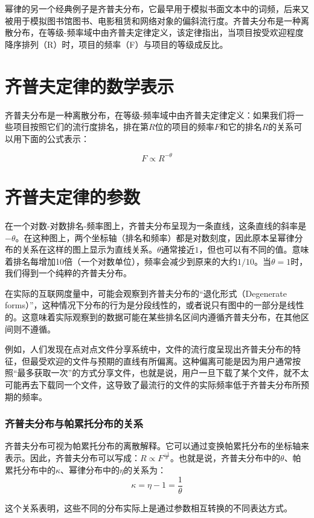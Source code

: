 幂律的另一个经典例子是齐普夫分布，它最早用于模拟书面文本中的词频，后来又被用于模拟图书馆图书、电影租赁和网络对象的偏斜流行度。齐普夫分布是一种离散分布，在等级-频率域中由齐普夫定律定义，该定律指出，当项目按受欢迎程度降序排列（R）时，项目的频率（F）与项目的等级成反比。


\section{齐普夫定律的数学表示}

齐普夫分布是一种离散分布，在等级-频率域中由齐普夫定律定义：如果我们将一些项目按照它们的流行度排名，排在第$R$位的项目的频率$F$和它的排名$R$的关系可以用下面的公式表示：

\[F \propto R^{-\theta}\]

\section{齐普夫定律的参数}

在一个对数-对数排名-频率图上，齐普夫分布呈现为一条直线，这条直线的斜率是$-\theta$。在这种图上，两个坐标轴（排名和频率）都是对数刻度，因此原本呈幂律分布的关系在这样的图上显示为直线关系。$\theta$通常接近$1$，但也可以有不同的值。意味着排名每增加10倍（一个对数单位），频率会减少到原来的大约$1/10$。当$\theta=1$时，我们得到一个纯粹的齐普夫分布。

在实际的互联网度量中，可能会观察到齐普夫分布的“退化形式（Degenerate forms）”，这种情况下分布的行为是分段线性的，或者说只有图中的一部分是线性的。这意味着实际观察到的数据可能在某些排名区间内遵循齐普夫分布，在其他区间则不遵循。

例如，人们发现在点对点文件分享系统中，文件的流行度呈现出齐普夫分布的特征，但最受欢迎的文件与预期的直线有所偏离。这种偏离可能是因为用户通常按照“最多获取一次”的方式分享文件，也就是说，用户一旦下载了某个文件，就不太可能再去下载同一个文件，这导致了最流行的文件的实际频率低于齐普夫分布所预期的频率。

\subsubsection{齐普夫分布与帕累托分布的关系}

齐普夫分布可视为帕累托分布的离散解释。它可以通过变换帕累托分布的坐标轴来表示。因此，齐普夫分布可以写成：$R \propto F^{\frac{-1}{\theta}}$。也就是说，齐普夫分布中的$\theta$、帕累托分布中的$\kappa$、幂律分布中的$\eta$的关系为：
\[\kappa = \eta - 1 = \frac{1}{\theta}\]

这个关系表明，这些不同的分布实际上是通过参数相互转换的不同表达方式。

